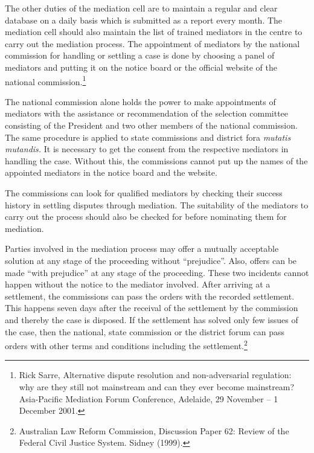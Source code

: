 \begin{multicols}{2}
\noi
The other duties of the mediation cell are to maintain a regular and clear database on a daily
basis which is submitted as a report every month. The mediation cell should also maintain the
list of trained mediators in the centre to carry out the mediation process. The appointment of
mediators by the national commission for handling or settling a case is done by choosing a
panel of mediators and putting it on the notice board or the official website of the national
commission.\footnote{Rick Sarre, Alternative dispute resolution and non-adversarial regulation: why are they still not mainstream and can they ever become mainstream? Asia-Pacific Mediation Forum Conference, Adelaide, 29 November – 1 December 2001.}

\noi
The national commission alone holds the power to make appointments of mediators with the
assistance or recommendation of the selection committee consisting of the President and two
other members of the national commission. The same procedure is applied to state commissions
and district fora \textit{mutatis mutandis.} It is necessary to get the consent from the respective
mediators in handling the case. Without this, the commissions cannot put up the names of the
appointed mediators in the notice board and the website.

\noi
The commissions can look for qualified mediators by checking their success history in settling
disputes through mediation. The suitability of the mediators to carry out the process should
also be checked for before nominating them for mediation.

\noi
Parties involved in the mediation process may offer a mutually acceptable solution at any stage
of the proceeding without “prejudice”. Also, offers can be made “with prejudice” at any stage of the proceeding. These two incidents cannot happen without the notice to the mediator
involved. After arriving at a settlement, the commissions can pass the orders with the recorded
settlement. This happens seven days after the receival of the settlement by the commission and
thereby the case is disposed. If the settlement has solved only few issues of the case, then the
national, state commission or the district forum can pass orders with other terms and conditions
including the settlement.\footnote{Australian Law Reform Commission, Discussion Paper 62: Review of the Federal Civil Justice System. Sidney (1999).}



\end{multicols}
